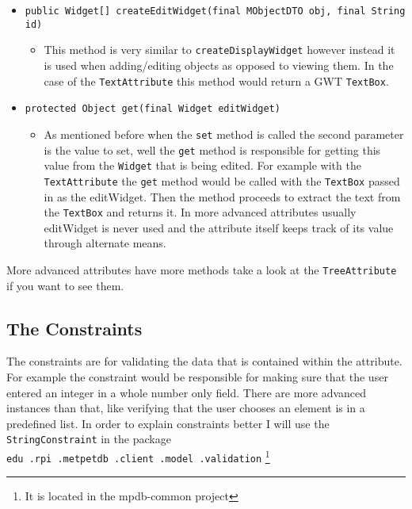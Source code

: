 \documentclass[10pt,letterpaper,onecolumn,oneside]{report}
\begin{document}
\begin{itemize}
\item \texttt{public Widget[] createEditWidget(final MObjectDTO obj, final String id)}
\begin{itemize}
\item This method is very similar to \texttt{createDisplayWidget} however
instead it is used when adding/editing objects as opposed to viewing them.  In
the case of the \texttt{TextAttribute} this method would return a GWT
\texttt{TextBox}.
\end{itemize}
\item \texttt{protected Object get(final Widget editWidget)}
\begin{itemize}
\item As mentioned before when the \texttt{set} method is called the second
parameter is the value to set, well the \texttt{get} method is responsible
for getting this value from the \texttt{Widget} that is being edited.  For
example with the \texttt{TextAttribute} the \texttt{get} method would be called
with the \texttt{TextBox} passed in as the editWidget.  Then the method 
proceeds to extract the text from the \texttt{TextBox} and returns it.  In more
advanced attributes usually editWidget is never used and the attribute itself
keeps track of its value through alternate means.
\end{itemize}
\end{itemize}
More advanced attributes have more methods take a look at the \texttt{TreeAttribute} if you want to see them.
\subsection{The Constraints}
The constraints are for validating the data that is contained within the 
attribute.  For example the constraint would be responsible for making sure
that the user entered an integer in a whole number only field.  There are more
advanced instances than that, like verifying that the user chooses an element
is in a predefined list.  In order to explain constraints better I will use the
\texttt{StringConstraint} in the package \texttt{edu\ .rpi\ .metpetdb\ .client\
.model\ .validation}
\footnote{It is located in the mpdb-common project}
\end{document}
